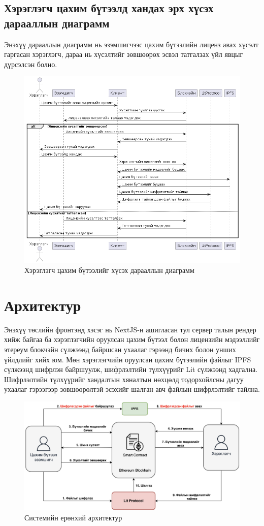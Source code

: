 \pagebreak
\subsection{Хэрэглэгч цахим бүтээлд хандах эрх хүсэх дарааллын диаграмм}
Энэхүү дарааллын диаграмм нь эзэмшигчээс цахим бүтээлийн лиценз авах хүсэлт гаргасан хэрэглэгч, дараа нь хүсэлтийг зөвшөөрөх эсвэл татгалзах үйл явцыг дүрсэлсэн болно.
\begin{figure}[h!]
	\centering
	\includegraphics[scale=0.6,]{src/images/sequence-2.png}
	\caption{Хэрэглэгч цахим бүтээлийг хүсэх дарааллын диаграмм}
\end{figure}

\newpage
\section{Архитектур}
Энэхүү төслийн фронтэнд хэсэг нь NextJS-н ашигласан тул сервер талын рендер хийж байгаа ба хэрэглэгчийн оруулсан цахим бүтээл болон лицензийн мэдээллийг этереум блокчэйн сүлжээнд байршсан ухаалаг гэрээнд бичих болон унших үйлдлийг хийх юм. Мөн хэрэглэгчийн оруулсан цахим бүтээлийн файлыг IPFS сүлжээнд шифрлэн байршуулж, шифрлэлтийн түлхүүрийг Lit сүлжээнд хадгална. Шифрлэлтийн түлхүүрийг хандалтын хяналтын нөхцөлд тодорхойлсны дагуу ухаалаг гэрээгээр зөвшөөрөлтэй эсэхийг шалган авч файлын шифрлэлтийг тайлна. \\

\begin{figure}[h!]
	\centering
	\includegraphics[scale=0.26]{src/images/architecture.png}
	\caption{Системийн ерөнхий архитектур}
\end{figure}
